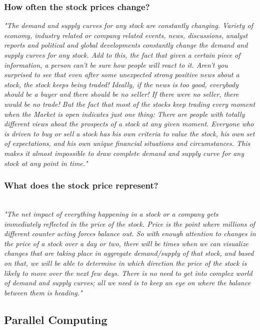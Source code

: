  \subsubsection{How often the stock prices change?}
	\emph{"The demand and supply curves for any stock are constantly changing. Variety of economy, industry related or company related events, news, discussions, analyst reports and political and global developments constantly change the demand and supply curves for any stock. Add to this, the fact that given a certain piece of information, a person can’t be sure how people will react to it. Aren’t you surprised to see that even after some unexpected strong positive news about a stock, the stock keeps being traded! Ideally, if the news is too good, everybody should be a buyer and there should be no seller! If there were no seller, there would be no trade! But the fact that most of the stocks keep trading every moment when the Market is open indicates just one thing: There are people with totally different views about the prospects of a stock at any given moment. Everyone who is driven to buy or sell a stock has his own criteria to value the stock, his own set of expectations, and his own unique financial situations and circumstances. This makes it almost impossible to draw complete demand and supply curve for any stock at any point in time."}
	
 \subsubsection{What does the stock price represent?}
	\\ \emph{"The net impact of everything happening in a stock or a company gets immediately reflected in the price of the stock. Price is the point where millions of different counter acting forces balance out. So with enough attention to changes in the price of a stock over a day or two, there will be times when we can visualize changes that are taking place in aggregate demand/supply of that stock, and based on that, we will be able to determine in which direction the price of the stock is likely to move over the next few days. There is no need to get into complex world of demand and supply curves; all we need is to keep an eye on where the balance between them is heading."}


\clearpage
\subsection{Parallel Computing}\label{ParallelComputing}

